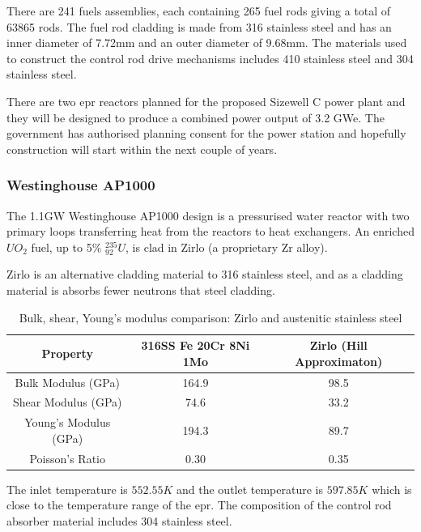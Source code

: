 There are 241 fuels assemblies, each containing 265 fuel rods giving a total of 63865 rods.  The fuel rod cladding is made from 316 stainless steel and has an inner diameter of 7.72mm and an outer diameter of 9.68mm.  The materials used to construct the control rod drive mechanisms includes 410 stainless steel and 304 stainless steel.

There are two \acrshort{epr} reactors planned for the proposed Sizewell C power plant and they will be designed to produce a combined power output of 3.2 GWe.  The government has authorised planning consent for the power station and hopefully construction will start within the next couple of years.


\subsubsection{Westinghouse AP1000}

The 1.1GW Westinghouse AP1000 design is a pressurised water reactor with two primary loops transferring heat from the reactors to heat exchangers.  An enriched $UO_2$ fuel, up to 5\% ${}^{235}_{92}U$, is clad in Zirlo (a proprietary \Gls{Zr} alloy).  

Zirlo is an alternative cladding material to 316 stainless steel, and as a cladding material is absorbs fewer neutrons that steel cladding.  

\begin{table}[h]
\begin{center}
\renewcommand{\arraystretch}{1.2}
\begin{tabular}{c c c}
\hline\hline
Property & 316SS Fe 20Cr 8Ni 1Mo & Zirlo (Hill Approximaton) \\
\hline\hline
Bulk Modulus (GPa)     & 164.9 \cite{elasticprofecr}  & 98.5 \cite{crystengcommzirlo} \\
Shear Modulus (GPa)    & 74.6 \cite{elasticprofecr}   & 33.2 \cite{crystengcommzirlo} \\
Young's Modulus (GPa)  & 194.3 \cite{elasticprofecr}  & 89.7 \cite{crystengcommzirlo} \\
Poisson's Ratio        & 0.30 \cite{elasticprofecr}   & 0.35 \cite{crystengcommzirlo} \\
\hline\hline
\end{tabular}
\end{center}
\caption{Bulk, shear, Young's modulus comparison: Zirlo and austenitic stainless steel }
\end{table}

The inlet temperature is $552.55K$ and the outlet temperature is $597.85K$ which is close to the temperature range of the \acrshort{epr}.  The composition of the control rod absorber material includes 304 stainless steel.









